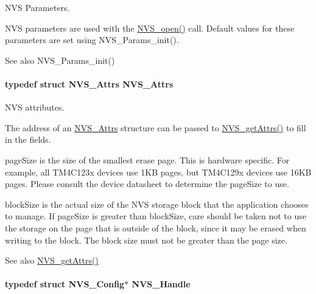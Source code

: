 N\+V\+S Parameters. 

N\+V\+S parameters are used with the \hyperlink{_n_v_s_8h_ad3a3d1f1477312eeee6d2c907a25bd67}{N\+V\+S\+\_\+open()} call. Default values for these parameters are set using N\+V\+S\+\_\+\+Params\+\_\+init().

\begin{DoxySeeAlso}{See also}
N\+V\+S\+\_\+\+Params\+\_\+init() 
\end{DoxySeeAlso}
\paragraph[{N\+V\+S\+\_\+\+Attrs}]{\setlength{\rightskip}{0pt plus 5cm}typedef struct {\bf N\+V\+S\+\_\+\+Attrs}  {\bf N\+V\+S\+\_\+\+Attrs}}\label{_n_v_s_8h_a28426a848b1ff2a02474ea663856345f}


N\+V\+S attributes. 

The address of an \hyperlink{struct_n_v_s___attrs}{N\+V\+S\+\_\+\+Attrs} structure can be passed to \hyperlink{_n_v_s_8h_a6b92f45097f377824524f7a4f33f02b1}{N\+V\+S\+\_\+get\+Attrs()} to fill in the fields.

page\+Size is the size of the smallest erase page. This is hardware specific. For example, all T\+M4\+C123x devices use 1\+K\+B pages, but T\+M4\+C129x devices use 16\+K\+B pages. Please consult the device datasheet to determine the page\+Size to use.

block\+Size is the actual size of the N\+V\+S storage block that the application chooses to manage. If page\+Size is greater than block\+Size, care should be taken not to use the storage on the page that is outside of the block, since it may be erased when writing to the block. The block size must not be greater than the page size.

\begin{DoxySeeAlso}{See also}
\hyperlink{_n_v_s_8h_a6b92f45097f377824524f7a4f33f02b1}{N\+V\+S\+\_\+get\+Attrs()} 
\end{DoxySeeAlso}
\paragraph[{N\+V\+S\+\_\+\+Handle}]{\setlength{\rightskip}{0pt plus 5cm}typedef struct {\bf N\+V\+S\+\_\+\+Config}$\ast$ {\bf N\+V\+S\+\_\+\+Handle}}\label{_n_v_s_8h_a1ee0bd7b3cd443236454a8cb1f56ad44}


